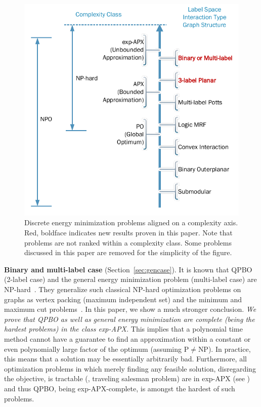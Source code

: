 \begin{figure}
\begin{center}
   \includegraphics[width=0.6\linewidth]{figure/HardnessAxis.pdf}
\end{center}
    \caption{Discrete energy minimization problems aligned on a complexity axis. Red, boldface indicates new results proven in this paper. Note that problems are not ranked within a complexity class. Some problems discussed in this paper are removed for the simplicity of the figure.}
\label{fig:hardnessaxis}
\end{figure}

\textbf{Binary and multi-label case}  (Section~\ref{sec:gencase}). It is known that QPBO (2-label case) and the general energy minimization problem (multi-label case) are NP-hard~\cite{BorosHammer02}. They generalize such classical NP-hard optimization problems on graphs as vertex packing (maximum independent set) and the minimum and maximum cut problems~\cite{Karp-72}.
In this paper, we show a much stronger conclusion. \emph{We prove that QPBO as well as general energy minimization are complete (being the hardest problems) in the class exp-APX.} This implies that a polynomial time method cannot have a guarantee to find an approximation within a constant or even polynomially large factor of the optimum (assuming P$\neq$NP).
In practice, this means that a solution may be essentially arbitrarily bad.
Furthermore, all optimization problems in which merely finding any feasible solution, disregarding the objective, is tractable (\eg, traveling salesman problem) are in exp-APX (see ) and thus QPBO, being exp-APX-complete, is amongst the hardest of such problems.


